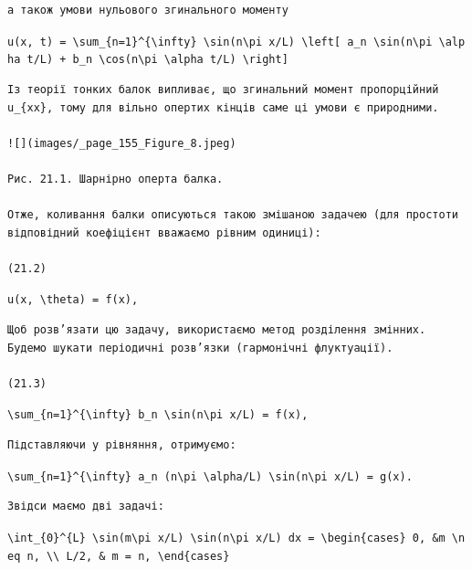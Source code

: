 \documentclass[
  ukrainian,
]{article}
\begin{document}
\begin{verbatim}
а також умови нульового згинального моменту
\end{verbatim}

\texttt{u(x,\ t)\ =\ \textbackslash{}sum\_\{n=1\}\^{}\{\textbackslash{}infty\}\ \textbackslash{}sin(n\textbackslash{}pi\ x/L)\ \textbackslash{}left{[}\ a\_n\ \textbackslash{}sin(n\textbackslash{}pi\ \textbackslash{}alpha\ t/L)\ +\ b\_n\ \textbackslash{}cos(n\textbackslash{}pi\ \textbackslash{}alpha\ t/L)\ \textbackslash{}right{]}}

\begin{verbatim}
Із теорії тонких балок випливає, що згинальний момент пропорційний u_{xx}, тому для вільно опертих кінців саме ці умови є природними.

![](images/_page_155_Figure_8.jpeg)

Рис. 21.1. Шарнірно оперта балка.

Отже, коливання балки описуються такою змішаною задачею (для простоти відповідний коефіцієнт вважаємо рівним одиниці):

(21.2)
\end{verbatim}

\texttt{u(x,\ \textbackslash{}theta)\ =\ f(x),}

\begin{verbatim}
Щоб розв’язати цю задачу, використаємо метод розділення змінних. Будемо шукати періодичні розв’язки (гармонічні флуктуації).

(21.3)
\end{verbatim}

\texttt{\textbackslash{}sum\_\{n=1\}\^{}\{\textbackslash{}infty\}\ b\_n\ \textbackslash{}sin(n\textbackslash{}pi\ x/L)\ =\ f(x),}

\begin{verbatim}
Підставляючи у рівняння, отримуємо:
\end{verbatim}

\texttt{\textbackslash{}sum\_\{n=1\}\^{}\{\textbackslash{}infty\}\ a\_n\ (n\textbackslash{}pi\ \textbackslash{}alpha/L)\ \textbackslash{}sin(n\textbackslash{}pi\ x/L)\ =\ g(x).}

\begin{verbatim}
Звідси маємо дві задачі:
\end{verbatim}

\texttt{\textbackslash{}int\_\{0\}\^{}\{L\}\ \textbackslash{}sin(m\textbackslash{}pi\ x/L)\ \textbackslash{}sin(n\textbackslash{}pi\ x/L)\ dx\ =\ \textbackslash{}begin\{cases\}\ 0,\ \&m\ \textbackslash{}neq\ n,\ \textbackslash{}\textbackslash{}\ L/2,\ \&\ m\ =\ n,\ \textbackslash{}end\{cases\}}
\end{document}
